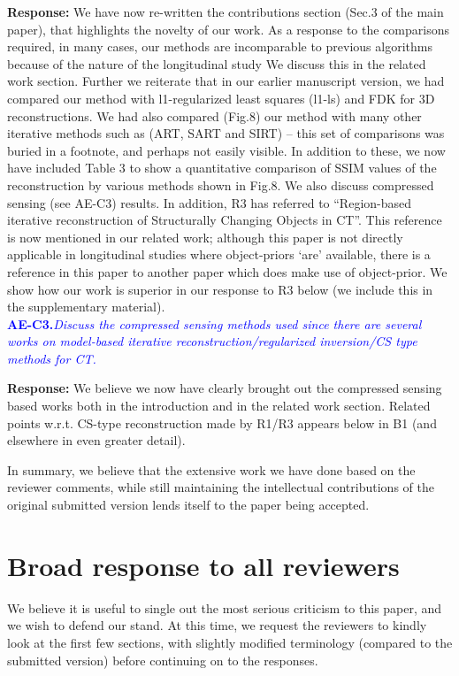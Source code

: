 \documentclass{article}
\begin{document}
\textbf{Response:} We have now re-written the contributions section (Sec.3 of the main paper), that highlights the novelty of our work.  
As a response to the comparisons required,  in many cases, our methods are incomparable to previous algorithms because of the nature of the longitudinal study  We discuss this in the related work section. Further we reiterate that in our earlier manuscript version, we had compared our method with l1-regularized least squares (l1-ls) and FDK for 3D reconstructions. We had also compared (Fig.8) our method with many other iterative methods such as (ART, SART and SIRT) -- this set of comparisons was buried in a footnote, and perhaps not easily visible.
In addition to these, we now have included Table 3 to show a quantitative comparison of SSIM values of the reconstruction by various methods shown in Fig.8.  We also discuss compressed sensing (see AE-C3) results.
In addition, 
R3 has referred to ``Region-based iterative reconstruction of Structurally Changing Objects in CT''. This reference is now mentioned in our related work; although this paper is not directly applicable in longitudinal studies where object-priors `are' available, there is a reference in this paper to another paper which does make use of object-prior. We show how our work is superior in our response to R3 below (we include this in the supplementary material). \\

\textcolor{blue}{\textbf{AE-C3.}\textit{Discuss the compressed sensing methods used since there are several works on model-based iterative reconstruction/regularized inversion/CS type methods for CT.}}

\textbf{Response:} We believe we now have clearly brought out the compressed sensing based works both in the introduction and in the related work section.  Related points w.r.t. CS-type reconstruction made by R1/R3 appears below in B1 (and elsewhere in even greater detail).

In summary, we believe that the extensive work we have done based on the reviewer comments, while still maintaining the intellectual contributions of the original submitted version lends itself to the paper being accepted.

\section{Broad response to all reviewers}

We believe it is useful to single out the most serious criticism to this paper, and we wish to defend our stand. At this time, we request the reviewers  to kindly look at the first few sections, with slightly modified terminology (compared to the submitted version)  before continuing on to the responses. 
\end{document}
